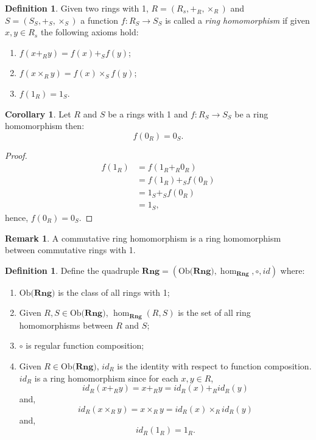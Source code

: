 \documentclass[11pt,a4paper]{article}
\theoremstyle{definition}
\newtheorem{cor}[thm]{Corollary}
\newtheorem{definition}[thm]{Definition}
\newtheorem{remark}[thm]{Remark}
\newcommand\ho[3][]{\hom_{#1}(#2,#3)}
\newcommand\ob[1]{\mathrm{Ob(}#1\mathrm{)}}
\numberwithin{equation}{section}
\begin{document}
\begin{definition}
\label{def:ringhomo}
Given two rings with 1, $R=(R_{s},+_{R},\times_{R})$ and $S=(S_{S},+_{S},\times_{S})$ a function $f\colon R_{S}\rightarrow S_{S}$ is called a \emph{ring homomorphism} if given $x,y\in R_{s}$ the following axioms hold:
\begin{enumerate}
    \item $f(x+_{R}y)=f(x)+_{S}f(y)$;
    \item $f(x\times_{R}y)=f(x)\times_{S}f(y)$;
    \item $f(1_{R})=1_{S}$.
\end{enumerate}
\end{definition}
\begin{cor}
\label{cor:ringhom0to0}
Let $R$ and $S$ be a rings with 1 and $f\colon R_{S}\to S_{S}$ be a ring homomorphism then:
\[f(0_{R})=0_{S}.\]
\end{cor}
\begin{proof}
    \begin{align*}
    f(1_{R}) &= f(1_{R}+_{R}0_{R}) \\
    &= f(1_{R})+_{S}f(0_{R}) \\
    &= 1_{S}+_{S}f(0_{R}) \\
    &= 1_{S},
    \end{align*}
    hence, $f(0_{R})=0_{S}$.
\end{proof}
\begin{remark}
A commutative ring homomorphism is a ring homomorphism between commutative rings with 1. 
\end{remark}
\begin{definition}
    \label{def:catofrings}
    Define the quadruple $\mathbf{Rng}=(\ob{\mathbf{Rng}},\hom_{\mathbf{Rng}},\circ,id)$ where:
    \begin{enumerate}
    \item $\ob{\mathbf{Rng}}$ is the class of all rings with 1;
    \item Given $R,S\in \ob{\mathbf{Rng}}$, $\ho[\mathbf{Rng}]{R}{S}$ is the set of all ring homomorphisms between $R$ and $S$;
    \item $\circ$ is regular function composition;
    \item Given $R\in \ob{\mathbf{Rng}}$, $id_{R}$ is the identity with respect to function composition. $id_{R}$ is a ring homomorphism since for each $x,y\in R$,\[id_{R}(x+_{R}y)=x+_{R}y=id_{R}(x)+_{R}id_{R}(y)\] and, \[id_{R}(x\times_{R}y)=x\times_{R}y=id_{R}(x)\times_{R}id_{R}(y)\] and,
    \[id_{R}(1_{R})=1_{R}.\]
\end{enumerate}
\end{definition}
\end{document}
